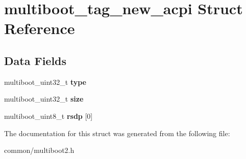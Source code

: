 \hypertarget{structmultiboot__tag__new__acpi}{}\section{multiboot\+\_\+tag\+\_\+new\+\_\+acpi Struct Reference}
\label{structmultiboot__tag__new__acpi}
\subsection*{Data Fields}
\begin{DoxyCompactItemize}
\item 
multiboot\+\_\+uint32\+\_\+t {\bfseries type}\hypertarget{structmultiboot__tag__new__acpi_aee0c6ade0df548e612e832ae26a23bae}{}\label{structmultiboot__tag__new__acpi_aee0c6ade0df548e612e832ae26a23bae}

\item 
multiboot\+\_\+uint32\+\_\+t {\bfseries size}\hypertarget{structmultiboot__tag__new__acpi_aa0c1ca8cc3037b48e00987dd255c585e}{}\label{structmultiboot__tag__new__acpi_aa0c1ca8cc3037b48e00987dd255c585e}

\item 
multiboot\+\_\+uint8\+\_\+t {\bfseries rsdp} \mbox{[}0\mbox{]}\hypertarget{structmultiboot__tag__new__acpi_a5e2b12abb589dc98859ddd9b0d59cda5}{}\label{structmultiboot__tag__new__acpi_a5e2b12abb589dc98859ddd9b0d59cda5}

\end{DoxyCompactItemize}


The documentation for this struct was generated from the following file\+:\begin{DoxyCompactItemize}
\item 
common/multiboot2.\+h\end{DoxyCompactItemize}
